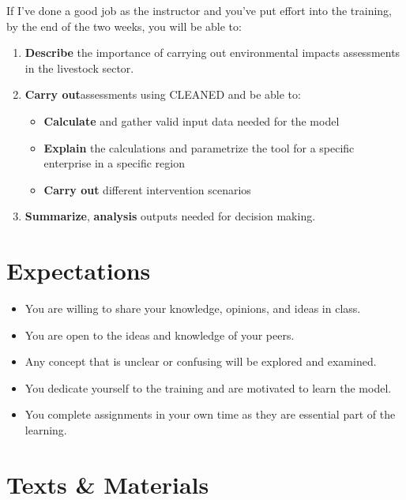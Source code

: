 \documentclass[
]{book}
\providecommand{\tightlist}{%
  \setlength{\itemsep}{0pt}\setlength{\parskip}{0pt}}
\begin{document}
If I've done a good job as the instructor and you've put effort into the training, by the end of the two weeks, you will be able to:

\begin{enumerate}
\def\labelenumi{\arabic{enumi}.}
\tightlist
\item
  \textbf{Describe} the importance of carrying out environmental impacts assessments in the livestock sector.
\item
  \textbf{Carry out}assessments using CLEANED and be able to:

  \begin{itemize}
  \tightlist
  \item
    \textbf{Calculate} and gather valid input data needed for the model
  \item
    \textbf{Explain} the calculations and parametrize the tool for a specific enterprise in a specific region
  \item
    \textbf{Carry out} different intervention scenarios
  \end{itemize}
\item
  \textbf{Summarize}, \textbf{analysis} outputs needed for decision making.
\end{enumerate}

\hypertarget{expectations}{%
\section{Expectations}\label{expectations}}

\begin{itemize}
\tightlist
\item
  You are willing to share your knowledge, opinions, and ideas in class.
\item
  You are open to the ideas and knowledge of your peers.
\item
  Any concept that is unclear or confusing will be explored and examined.
\item
  You dedicate yourself to the training and are motivated to learn the model.
\item
  You complete assignments in your own time as they are essential part of the learning.
\end{itemize}

\hypertarget{texts-materials}{%
\section{Texts \& Materials}\label{texts-materials}}
\end{document}
